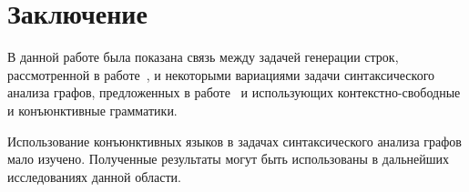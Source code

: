 \section{Заключение}

В данной работе была показана связь между задачей генерации строк, рассмотренной в работе~\cite{azimov-spbu-Okhotin}, и некоторыми вариациями задачи синтаксического анализа графов, предложенных в работе~\cite{azimov-spbu-hellings1, azimov-spbu-hellings2} и использующих контекстно-свободные и конъюнктивные грамматики.

Использование конъюнктивных языков в задачах синтаксического анализа графов мало изучено. Полученные результаты могут быть использованы в дальнейших исследованиях данной области.